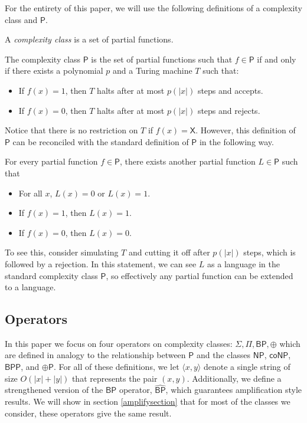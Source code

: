\documentclass[11pt]{article}
\newcommand{\bp}{\textsf{BP}}
\newcommand{\strongbp}{\widehat{\textsf{BP}}}
\newcommand{\bpp}{\textsf{BPP}}
\newcommand{\parity}{\oplus}
\newcommand{\p}{\textsf{P}}
\newcommand{\np}{\textsf{NP}}
\newcommand{\conp}{\textsf{coNP}}
\newcommand{\x}{\textsf{X}}
\begin{document}
For the entirety of this paper, we will use the following definitions of a complexity class and $\p$.

\begin{definition}\label{complexityclass}
A \emph{complexity class} is a set of partial functions.
\end{definition}

\begin{definition}\label{p}
The complexity class $\p$ is the set of partial functions such that $f \in \p$ if and only if there exists a polynomial $p$ and a Turing machine $T$ such that:
\begin{itemize}
\item If $f(x) = 1$, then $T$ halts after at most $p(|x|)$ steps and accepts.
\item If $f(x) = 0$, then $T$ halts after at most $p(|x|)$ steps and rejects.
\end{itemize}
\end{definition}

Notice that there is no restriction on $T$ if $f(x) = \x$. However, this definition of $\p$ can be reconciled with the standard definition of $\p$ in the following way.

\begin{remark}
For every partial function $f \in \p$, there exists another partial function $L \in \p$ such that
\begin{itemize}
\item For all $x$, $L(x) = 0$ or $L(x) = 1$.
\item If $f(x) = 1$, then $L(x) = 1$.
\item If $f(x) = 0$, then $L(x) = 0$.
\end{itemize}
\end{remark}

To see this, consider simulating $T$ and cutting it off after $p(|x|)$ steps, which is followed by a rejection. In this statement, we can see $L$ as a language in the standard complexity class $\p$, so effectively any partial function can be extended to a language.

\subsection{Operators}

In this paper we focus on four operators on complexity classes: $\Sigma, \Pi, \bp, \parity$ which are defined in analogy to the relationship between $\p$ and the classes $\np$, $\conp$, $\bpp$, and $\parity\p$. For all of these definitions, we let $\langle x, y\rangle$ denote a single string of size $O(|x| + |y|)$ that represents the pair $(x,y)$. Additionally, we define a strengthened version of the $\bp$ operator, $\strongbp$, which guarantees amplification style results. We will show in section \ref{amplifysection} that for most of the classes we consider, these operators give the same result.
\end{document}
